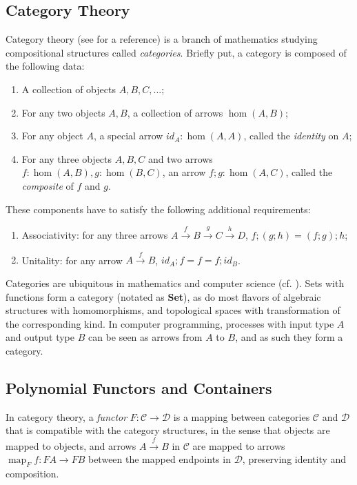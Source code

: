 \documentclass[a4paper]{article}
\DeclareMathOperator{\map}{map}
\newcommand{\catname}[1]{{\normalfont\textbf{#1}}}
\newcommand{\Set}{\catname{Set}}
\begin{document}
\subsection{Category Theory}

Category theory (see \cite{Riehl2017} for a reference) is a branch of mathematics studying compositional structures called \textit{categories}. Briefly put, a category is composed of the following data:

\begin{enumerate}
	\item A collection of objects \(A, B, C, ...\);
	\item For any two objects \(A, B\), a collection of arrows \(\hom(A, B)\);
	\item For any object \(A\), a special arrow \(id_A : \hom(A, A)\), called the \textit{identity} on \(A\);
	\item For any three objects \(A, B, C\) and two arrows \(f : \hom(A, B), g : \hom(B, C)\), an arrow \(f ; g : \hom(A, C)\), called the \textit{composite} of \(f\) and \(g\).
\end{enumerate}

These components have to satisfy the following additional requirements:

\begin{enumerate}
	\item Associativity: for any three arrows \(A \xrightarrow{f} B \xrightarrow{g} C \xrightarrow{h} D\), \(f ; (g ; h) = (f ; g) ; h\);
	\item Unitality: for any arrow \(A \xrightarrow{f} B\), \(id_A ; f = f = f ; id_B\).
\end{enumerate}

Categories are ubiquitous in mathematics and computer science (cf. \cite{Walters1992}). Sets with functions form a category (notated as \Set{}), as do most flavors of algebraic structures with homomorphisms, and topological spaces with transformation of the corresponding kind. In computer programming, processes with input type \(A\) and output type \(B\) can be seen as arrows from \(A\) to \(B\), and as such they form a category.

\subsection{Polynomial Functors and Containers}

In category theory, a \textit{functor} \(F : \mathcal C \to \mathcal D\) is a mapping between categories \(\mathcal C\) and \(\mathcal D\) that is compatible with the category structures, in the sense that objects are mapped to objects, and arrows \(A \xrightarrow{f} B\) in \(\mathcal C\) are mapped to arrows \(\map_F f : F A \to F B\) between the mapped endpoints in \(\mathcal D\), preserving identity and composition.
\end{document}
